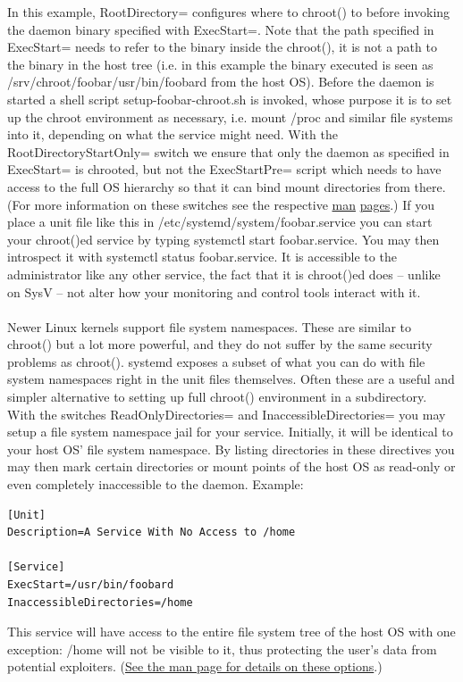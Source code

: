 \documentclass[titlepage]{article}
\begin{document}
In this example, RootDirectory= configures where to chroot() to before invoking the daemon binary specified with ExecStart=. Note that the path specified in ExecStart= needs to refer to the binary inside the chroot(), it is not a path to the binary in the host tree (i.e. in this example the binary executed is seen as /srv/chroot/foobar/usr/bin/foobard from the host OS). Before the daemon is started a shell script setup-foobar-chroot.sh is invoked, whose purpose it is to set up the chroot environment as necessary, i.e. mount /proc and similar file systems into it, depending on what the service might need. With the RootDirectoryStartOnly= switch we ensure that only the daemon as specified in ExecStart= is chrooted, but not the ExecStartPre= script which needs to have access to the full OS hierarchy so that it can bind mount directories from there. (For more information on these switches see the respective \href{https://0pointer.de/public/systemd-man/systemd.service.html}{man} \href{https://0pointer.de/public/systemd-man/systemd.exec.html}{pages}.) If you place a unit file like this in /etc/systemd/system/foobar.service you can start your chroot()ed service by typing systemctl start foobar.service. You may then introspect it with systemctl status foobar.service. It is accessible to the administrator like any other service, the fact that it is chroot()ed does -- unlike on SysV -- not alter how your monitoring and control tools interact with it.
\\
\\
Newer Linux kernels support file system namespaces. These are similar to chroot() but a lot more powerful, and they do not suffer by the same security problems as chroot(). systemd exposes a subset of what you can do with file system namespaces right in the unit files themselves. Often these are a useful and simpler alternative to setting up full chroot() environment in a subdirectory. With the switches ReadOnlyDirectories= and InaccessibleDirectories= you may setup a file system namespace jail for your service. Initially, it will be identical to your host OS' file system namespace. By listing directories in these directives you may then mark certain directories or mount points of the host OS as read-only or even completely inaccessible to the daemon. Example:
\begin{lstlisting}
[Unit]
Description=A Service With No Access to /home

[Service]
ExecStart=/usr/bin/foobard
InaccessibleDirectories=/home
\end{lstlisting}
This service will have access to the entire file system tree of the host OS with one exception: /home will not be visible to it, thus protecting the user's data from potential exploiters. (\href{https://0pointer.de/public/systemd-man/systemd.exec.html}{See the man page for details on these options}.)
\end{document}
